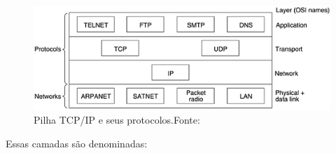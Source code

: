 \begin{figure}[H]
    \scriptsize
     \centering
     \includegraphics[scale=1]{dados/figuras/PilhaTCP-IP.png}
     \caption{Pilha TCP/IP e seus protocolos.\newline Fonte:\cite{tanenbaumRedes}}
     \label{fig:PilhaTCP}
\end{figure}

Essas camadas são denominadas:

